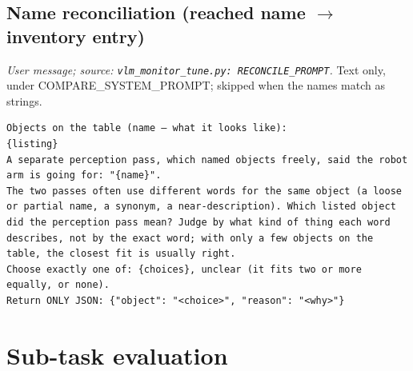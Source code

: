 \subsection*{Name reconciliation (reached name $\rightarrow$ inventory entry)}
\noindent\textit{User message; source: \texttt{vlm\_monitor\_tune.py: RECONCILE\_PROMPT}.} Text only, under COMPARE\_SYSTEM\_PROMPT; skipped when the names match as strings.
\begin{lstlisting}[style=prompt]
Objects on the table (name — what it looks like):
{listing}
A separate perception pass, which named objects freely, said the robot arm is going for: "{name}".
The two passes often use different words for the same object (a loose or partial name, a synonym, a near-description). Which listed object did the perception pass mean? Judge by what kind of thing each word describes, not by the exact word; with only a few objects on the table, the closest fit is usually right.
Choose exactly one of: {choices}, unclear (it fits two or more equally, or none).
Return ONLY JSON: {"object": "<choice>", "reason": "<why>"}
\end{lstlisting}

\section{Sub-task evaluation}
